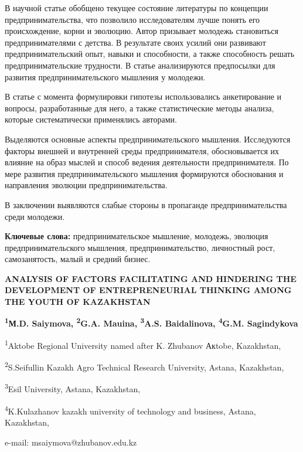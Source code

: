 В научной статье обобщено текущее состояние литературы по концепции
предпринимательства, что позволило исследователям лучше понять его
происхождение, корни и эволюцию. Автор призывает молодежь становиться
предпринимателями с детства. В результате своих усилий они развивают
предпринимательский опыт, навыки и способности, а также способность
решать предпринимательские трудности. В статье анализируются предпосылки
для развития предпринимательского мышления у молодежи.

В статье с момента формулировки гипотезы использовались анкетирование и
вопросы, разработанные для него, а также статистические методы анализа,
которые систематически применялись авторами.

Выделяются основные аспекты предпринимательского мышления. Исследуются
факторы внешней и внутренней среды предпринимателя, обосновывается их
влияние на образ мыслей и способ ведения деятельности предпринимателя.
По мере развития предпринимательского мышления формируются обоснования и
направления эволюции предпринимательства.

В заключении выявляются слабые стороны в пропаганде предпринимательства
среди молодежи.

{\bfseries Ключевые слова:} предпринимательское мышление, молодежь,
эволюция предпринимательского мышления, предпринимательство, личностный
рост, самозанятость, малый и средний бизнес.

\begin{articleheader}
{\bfseries ANALYSIS OF FACTORS FACILITATING AND HINDERING THE DEVELOPMENT OF ENTREPRENEURIAL THINKING AMONG THE YOUTH OF KAZAKHSTAN}

{\bfseries \textsuperscript{1}М.D. Saiymova, \textsuperscript{\envelope }
\textsuperscript{2}G.A. Mauina, \textsuperscript{3}A.S. Baidalinova,
\textsuperscript{4}G.M. Sagindykova}
\end{articleheader}
\begin{affiliation}

\textsuperscript{1}Aktobe Regional University named after K. Zhubanov
Акtobe, Kazakhstan,

\textsuperscript{2}S.Seifullin Kazakh Agro Technical Research
University, Astana, Kazakhstan,

\textsuperscript{3}Esil University, Astana, Kazakhstan,

\textsuperscript{4}K.Kulazhanov kazakh university of technology and
business, Astana, Kazakhstan,

e-mail: msaiymova@zhubanov.edu.kz
\end{affiliation}

